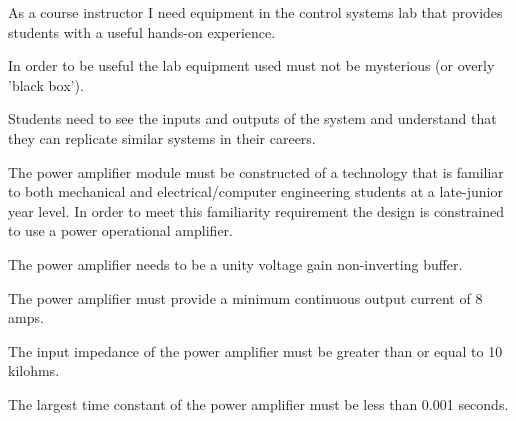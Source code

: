 As a course instructor I need equipment in the control systems lab that provides students with a useful hands-on experience.
\bigskip
  
In order to be useful the lab equipment used must not be mysterious (or overly 'black box').
\bigskip
  
Students need to see the inputs and outputs of the system and understand that they can replicate similar systems in their careers.
\bigskip
		
The power amplifier module must be constructed of a technology that is familiar to both mechanical and electrical/computer engineering students at a late-junior year level.  In order to meet this familiarity requirement the design is constrained to use a power operational amplifier.
\bigskip
		
The power amplifier needs to be a unity voltage gain non-inverting buffer. 
\bigskip

The power amplifier must provide a minimum continuous output current of 8 amps.
\bigskip

The input impedance of the power amplifier must be greater than or equal to 10 kilohms.
\bigskip
		
The largest time constant of the power amplifier must be less than 0.001 seconds.
\bigskip